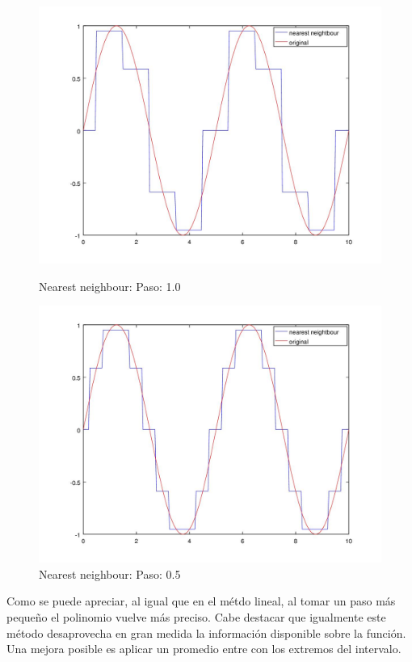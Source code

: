 \begin{figure}[h]
  \begin{minipage}[b]{.5\textwidth}
    \includegraphics[width=\textwidth]{complementos/nearest_1.jpg}
    \caption{Nearest neighbour: Paso: 1.0}
  \end{minipage}
  \begin{minipage}[b]{.5\textwidth}
    \includegraphics[width=\textwidth]{complementos/nearest_05.jpg}
    \caption{Nearest neighbour: Paso: 0.5}
  \end{minipage}
\end{figure}

Como se puede apreciar, al igual que en el métdo lineal, al tomar un paso más pequeño el polinomio vuelve más preciso. Cabe destacar que igualmente este método desaprovecha en gran medida la información disponible sobre la función. Una mejora posible es aplicar un promedio entre con los extremos del intervalo.

